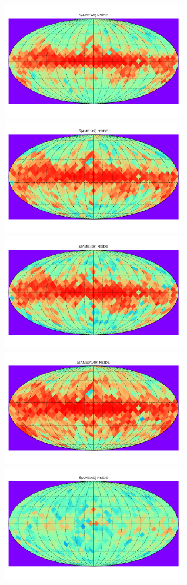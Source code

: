       \begin{figure}
        \label{fig:Spearman_Map_nside8_AMEtoIR}
        \includegraphics[width=80mm]{../Plots/Allsky_Corr/Spearman_Map_nside8_AMEtoA9.pdf}
        \includegraphics[width=80mm]{../Plots/Allsky_Corr/Spearman_Map_nside8_AMEtoI12.pdf}
        \includegraphics[width=80mm]{../Plots/Allsky_Corr/Spearman_Map_nside8_AMEtoI25.pdf}
        \includegraphics[width=80mm]{../Plots/Allsky_Corr/Spearman_Map_nside8_AMEtoA140.pdf}
        \includegraphics[width=80mm]{../Plots/Allsky_Corr/RadNorm/Spearman_Map_nside8_AMEtoA9.pdf}

\end{figure}

